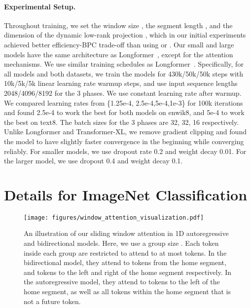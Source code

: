 \paragraph{Experimental Setup.}
Throughout training, we set the window size , the segment length , and the dimension of the dynamic low-rank projection , which in our initial experiments achieved better efficiency-BPC trade-off than using  or . Our small and large models have the same architecture as Longformer~\cite{beltagy2020longformer}, except for the attention mechanisms. We use similar training schedules as Longformer~\cite{beltagy2020longformer}. Specifically, for all models and both datasets, we train the models for 430k/50k/50k steps with 10k/5k/5k linear learning rate warmup steps, and use input sequence lengths 2048/4096/8192 for the 3 phases. We use constant learning rate after warmup. We compared learning rates from \{1.25e-4, 2.5e-4,5e-4,1e-3\} for 100k iterations and found 2.5e-4 to work the best for both models on enwik8, and 5e-4 to work the best on text8. The batch sizes for the 3 phases are 32, 32, 16 respectively. Unlike Longformer and Transformer-XL, we remove gradient clipping and found the model to have slightly faster convergence in the beginning while converging reliably. For smaller models, we use dropout rate 0.2 and weight decay 0.01. For the larger model, we use dropout 0.4 and weight decay 0.1. 



\section{Details for ImageNet Classification}
\label{appendix:image_params}

\begin{figure}
\begin{center}
    \texttt{[image: figures/window\_attention\_visualization.pdf]}
\end{center}
\caption{An illustration of our sliding window attention in 1D autoregressive and bidirectional models. Here, we use a group size . Each token inside each group are restricted to attend to at most  tokens. In the bidirectional model, they attend to  tokens from the home segment, and  tokens to the left and right of the home segment respectively. In the autoregressive model, they attend to  tokens to the left of the home segment, as well as all tokens within the home segment that is not a future token.}
\label{fig:window_attention}
\end{figure}

